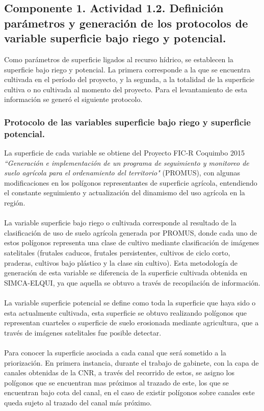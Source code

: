 \documentclass[]{article}
\begin{document}
\subsection{Componente 1. Actividad 1.2. Definición parámetros y generación de los protocolos de variable superficie bajo riego y potencial.}

Como parámetros de superficie ligados al recurso hídrico, se establecen la superficie bajo riego y potencial. La primera corresponde a la que se encuentra cultivada en el período del proyecto, y la segunda, a la totalidad de la superficie cultiva o no cultivada al momento del proyecto. Para el levantamiento de esta información se generó el siguiente protocolo.

\subsubsection{Protocolo de las variables superficie bajo riego y superficie potencial.}

La superficie de cada variable se obtiene del Proyecto FIC-R Coquimbo 2015 \textit{``Generación e implementación de un programa de seguimiento y monitoreo de suelo agrícola para el ordenamiento del territorio"} (PROMUS), con algunas modificaciones en los polígonos representantes de superficie agrícola, entendiendo el constante seguimiento y actualización del dinamismo del uso agrícola en la región.\\
\\
La variable superficie bajo riego o cultivada corresponde al resultado de la clasificación de uso de suelo agrícola generada por PROMUS, donde cada uno de estos polígonos representa una clase de cultivo mediante clasificación de imágenes satelitales (frutales caducos, frutales persistentes, cultivos de ciclo corto, praderas, cultivos bajo plástico y la clase sin cultivo). Esta metodología de generación de esta variable se diferencia de la superficie cultivada obtenida en SIMCA-ELQUI, ya que aquella se obtuvo a través de recopilación de información.\\
\\
La variable superficie potencial se define como toda la superficie que haya sido o esta actualmente cultivada, esta superficie se obtuvo realizando polígonos que representan cuarteles o superficie de suelo erosionada mediante agricultura, que a través de imágenes satelitales fue posible detectar.\\
\\
Para conocer la superficie asociada a cada canal que será sometido a la priorización. En primera instancia, durante el trabajo de gabinete, con la capa de canales obtenidas de la CNR, a través del recorrido de estos, se asigno los polígonos que se encuentran mas próximos al trazado de este, los que se encuentran bajo cota del canal, en el caso de existir polígonos sobre canales este queda sujeto al trazado del canal más próximo.
\end{document}
